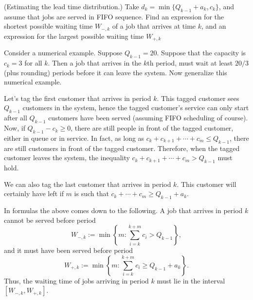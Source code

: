 \begin{exercise}\label{ex:19} (Estimating the lead time distribution.)  Take
  $d_k = \min\{Q_{k-1}+a_k, c_k\}$, and assume that jobs are served in
  FIFO sequence. Find an expression for the shortest possible waiting
  time $W_{-,k}$ of a job that arrives at time $k$, and an expression
  for the largest possible waiting time $W_{+,k}$
  \begin{hint}
  Consider a numerical example. Suppose $Q_{k-1}=20$. Suppose
    that the capacity is $c_k=3$ for all $k$. Then a job that arrives
    in the $k$th period, must wait at least $20/3$ (plus rounding)
    periods before it can leave the system. Now generalize this
    numerical example.
  \end{hint}
    \begin{solution}
      Let's tag the first customer that arrives in period $k$. This
      tagged customer sees $Q_{k-1}$ customers in the system, hence the
      tagged customer's service can only start after all $Q_{k-1}$
      customers have been served (assuming FIFO scheduling of course).  Now, if $Q_{k-1}-c_k \geq 0$, there are
      still people in front of the tagged customer, either in queue or in service. In fact, as long
      as $c_k+c_{k+1}+\cdots +c_m \leq Q_{k-1}$, there are still customers in
      front of the tagged customer. Therefore, when the tagged customer leaves the system, the inequality $c_k+c_{k+1}+\cdots +c_m > Q_{k-1}$ must hold.

      We can also tag the last customer that arrives in period
      $k$. This customer will certainly have left if $m$ is such that
      $c_k+\cdots+c_m \geq Q_{k-1}+a_k$.

      In formulas the above comes down to the following.  A job that
      arrives in period $k$ cannot be served before period
    \begin{equation*}
    W_{-,k}:= \min\left\{m: \sum_{i=k}^{k+m} c_i > Q_{k-1}\right\},
    \end{equation*}
    and it must have been served before period
    \begin{equation*}
      W_{+,k}:= \min\left\{m: \sum_{i=k}^{k+m} c_i \geq
        Q_{k-1}+a_k\right\}.
    \end{equation*}
    Thus, the waiting time of jobs arriving in period $k$ must lie in
    the interval $[W_{-,k}, W_{+,k}]$.
  \end{solution}
\end{exercise}

